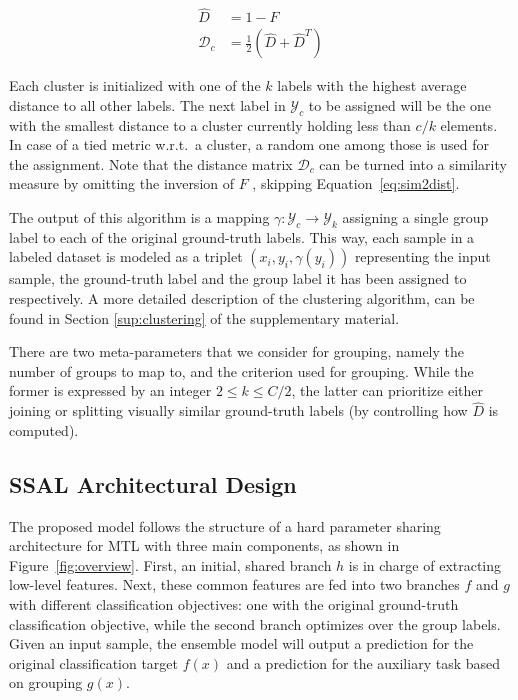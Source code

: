 \documentclass[10pt,twocolumn,letterpaper]{article}
\begin{document}
\begin{align}
\hat{D} &= 1 - F
\label{eq:sim2dist}
\\
\mathcal{D}_c &= \frac{1}{2} (\hat{D} + \hat{D}^T)
\label{eq:distancematrix}
\end{align}

Each cluster is initialized with one of the $k$ labels with the highest average distance to all other labels.
The next label in $\mathcal{Y}_c$ to be assigned will be the one with the smallest distance to a cluster currently holding less than $c/k$ elements.
In case of a tied metric w.r.t.~a cluster, a random one among those is used for the assignment.
Note that the distance matrix $\mathcal{D}_c$ can be turned into a similarity measure by omitting the inversion of $F$ \ie, skipping Equation~\ref{eq:sim2dist}.

The output of this algorithm is a mapping $\gamma: \mathcal{Y}_c \rightarrow \mathcal{Y}_k$ assigning a single group label to each of the original ground-truth labels.
This way, each sample in a labeled dataset is modeled as a triplet $(x_i, y_i, \gamma(y_i))$ representing the input sample, the ground-truth label and the group label it has been assigned to respectively.
A more detailed description of the clustering algorithm, can be found in Section \ref{sup:clustering} of the supplementary material.

There are two meta-parameters that we consider for grouping, namely the number of groups to map to, and the criterion used for grouping.
While the former is expressed by an integer $2 \le k \le C/2$, the latter can prioritize either joining or splitting visually similar ground-truth labels (by controlling how $\hat{D}$ is computed).


\subsection{SSAL Architectural Design}
The proposed model follows the structure of a hard parameter sharing architecture for MTL with three main components, as shown in Figure~\ref{fig:overview}.
First, an initial, shared branch $h$ is in charge of extracting low-level features.
Next, these common features are fed into two branches $f$ and $g$ with different classification objectives: one with the original ground-truth classification objective, while the second branch optimizes over the group labels.
Given an input sample, the ensemble model will output a prediction for the original classification target $f(x)$ and a prediction for the auxiliary task based on grouping $g(x)$.
\end{document}
